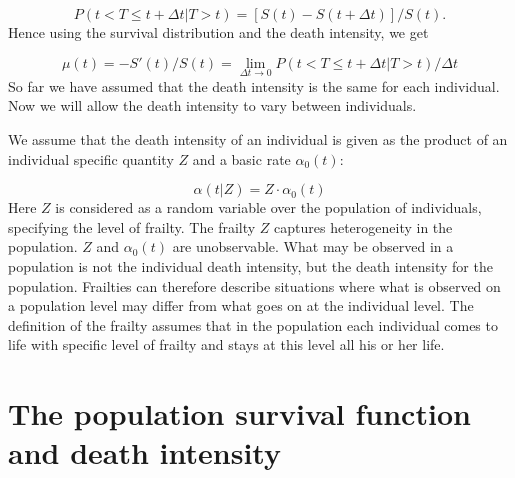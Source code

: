

\begin{equation*}
    P(t<T\leq{t+\Delta t  |  T>t}) = [S(t) - S(t + \Delta t)]/S(t).
\end{equation*} 
Hence using the survival distribution and the death intensity, we get 


\begin{equation*}
\mu(t) = - S'(t)/S(t) = \displaystyle {\lim_{\Delta t \to 0} P(t<T\leq{t+\Delta t | T>t})/ \Delta t}    
\end{equation*}
So far we have assumed that the death intensity is the same for each individual. 
Now we will allow the death intensity to vary between individuals.

We assume that the death intensity of an individual is given as the product of an individual specific quantity $ Z $ and a basic rate $\alpha_{0}(t)$:

\begin{equation}
    \alpha( t | Z) = Z \cdot\alpha_{0}(t)
    \label{frailty individual}
\end{equation}
Here $Z$ is considered as a random variable over the population of individuals, specifying the level of frailty.
The frailty $Z$ captures heterogeneity in the population.
$Z$ and $\alpha_{0}(t)$ are unobservable.
What may be observed in a population is not the individual death intensity, but the death intensity for the population.
Frailties can therefore describe situations where what is observed on a population level may differ from what goes on at the individual level.
The definition of the frailty assumes that in the population each individual comes to life with specific level of frailty and stays at this level all his or her life. 

\section{ The population survival function and death intensity }

